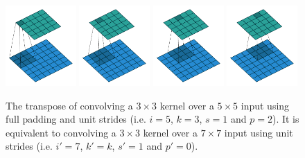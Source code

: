 \documentclass{report}
\begin{document}
\begin{figure}[p]
    \centering
    \includegraphics[width=0.24\textwidth]{pdf/full_padding_no_strides_transposed_00.pdf}
    \includegraphics[width=0.24\textwidth]{pdf/full_padding_no_strides_transposed_01.pdf}
    \includegraphics[width=0.24\textwidth]{pdf/full_padding_no_strides_transposed_02.pdf}
    \includegraphics[width=0.24\textwidth]{pdf/full_padding_no_strides_transposed_03.pdf}
    \caption{\label{fig:full_padding_no_strides_transposed} The transpose of
        convolving a $3 \times 3$ kernel over a $5 \times 5$ input using full
        padding and unit strides (i.e. $i = 5$, $k = 3$, $s = 1$ and $p = 2$).
        It is equivalent to convolving a $3 \times 3$ kernel over a $7 \times 7$
        input using unit strides (i.e. $i' = 7$, $k' = k$, $s' = 1$ and $p' =
        0$).}
\end{figure}
\end{document}
